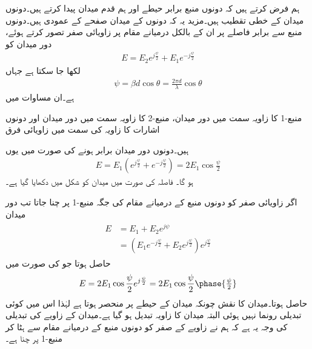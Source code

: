 ہم فرض کرتے ہیں کہ دونوں منبع برابر حیطے اور ہم قدم میدان پیدا کرتے ہیں۔دونوں میدان کے خطی تقطیب ہیں۔مزید یہ کہ دونوں کے  میدان صفحے کے عمودی ہیں۔دونوں منبع سے برابر فاصلے پر ان کے بالکل درمیانے مقام پر زاویائی صفر تصور کرتے ہوئے، دور میدان کو
\begin{align}
E=E_2 e^{j\frac{\psi}{2}} + E_1 e^{-j \frac{\psi}{2}}
\end{align}
لکھا جا سکتا ہے جہاں
\begin{align}
\psi=\beta d \cos \theta=\frac{2\pi d}{\lambda}\cos \theta
\end{align}
ہے۔ان مساوات میں 
\begin{description}
 منبع-1 کا زاویہ  سمت میں دور میدان،
 منبع-2 کا زاویہ  سمت میں دور میدان اور
 دونوں اشارات کا زاویہ  کی سمت میں زاویائی فرق
\end{description}
ہیں۔دونوں دور میدان برابر  ہونے کی صورت میں یوں
\begin{align}\label{مساوات_اینٹینا_دو_نقطہ_الف}
E=E_1 \left(e^{j\frac{\psi}{2}} + e^{-j \frac{\psi}{2}} \right)=2 E_1 \cos \frac{\psi}{2}
\end{align}
ہو گا۔ فاصلہ   کی صورت میں میدان کو شکل میں دکھایا گیا ہے۔

اگر زاویائی صفر کو دونوں منبع کے درمیانے مقام کی جگہ منبع-1 پر چنا جاتا تب دور میدان
\begin{gather}
\begin{aligned}\label{مساوات_اینٹینا_دو_رکنی_قطار}
E&=E_1+E_2 e^{j \psi}\\
&=\left(E_1 e^{-j\frac{\psi}{2}}+E_2 e^{j \frac{\psi}{2}}\right) e^{j\frac{\psi}{2}}
\end{aligned}
\end{gather}
حاصل ہوتا جو  کی صورت میں 
\begin{align}\label{مساوات_اینٹینا_دو_نقطہ_ب}
E=2 E_1 \cos \frac{\psi}{2} e^{j\frac{\psi}{2}}=2 E_1 \cos \frac{\psi}{2} \phase{\tfrac{\psi}{2}}
\end{align}
حاصل ہوتا۔میدان کا نقش  چونکہ میدان کے حیطے پر منحصر ہوتا ہے لہٰذا اس میں کوئی تبدیلی رونما نہیں ہوئی البتہ میدان کا زاویہ تبدیل ہو گیا ہے۔میدان کے زاویے کی تبدیلی کی وجہ یہ ہے کہ ہم نے زاویے کے صفر کو دونوں منبع کے درمیانے مقام سے ہٹا کر منبع-1 پر چنا ہے۔

